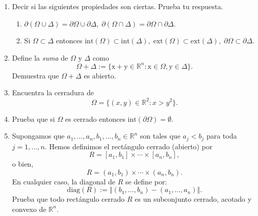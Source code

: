 \documentclass[12pt]{article}
\newcommand{\norm}[1]{\left\Vert#1\right\Vert}
\newcommand{\diag}{\mathrm{diag}}
\newcommand{\Ext}{\mathrm{ext}}
\newcommand{\Int}{\mathrm{int}}
\newcommand{\R}{\mathbb R}
\newcommand{\x}{\mathrm x}
\newcommand{\y}{\mathrm y}
\begin{document}
\begin{enumerate}
Para encontrar la cerradura, observamos que si tomamos puntos $(x,y)$ que cumplen $x^2 - y^2 > 1$ y los acercamos a la curva $x^2 - y^2 = 1$, podemos aproximarnos tanto como queramos. Por lo tanto, la cerradura de $\Omega$ es el conjunto donde $x^2 - y^2 \geq 1$. Es decir,
\[
\overline{\Omega} = \{ (x,y)\in \R^2 : x^2 - y^2 \geq 1 \}.
\]
Esto se debe a que la adherencia de un conjunto abierto definido por una desigualdad estricta con una función continua es el conjunto definido por la desigualdad no estricta correspondiente.

Ahora, determinamos la frontera. Usando la definición de frontera como $\partial \Omega = \overline{\Omega} \setminus \Int(\Omega)$, tenemos:
\[
\partial \Omega = \{ (x,y)\in \R^2 : x^2 - y^2 \geq 1 \} \setminus \{ (x,y)\in \R^2 : x^2 - y^2 > 1 \}.
\]
La diferencia entre estos dos conjuntos es precisamente el conjunto de puntos donde se cumple la igualdad. Por lo tanto,
\[
\partial \Omega = \{ (x,y)\in \R^2 : x^2 - y^2 = 1 \}.
\]

\item Decir si las siguientes propiedades son ciertas. Prueba tu respuesta.
\begin{enumerate}[(1)]
\item $\partial(\Omega\cup \Delta) = \partial \Omega\cup \partial \Delta,\; 
\partial(\Omega\cap \Delta) = \partial \Omega\cap \partial \Delta$.
\item Si $\Omega\subset \Delta$ entonces $\Int(\Omega)\subset \Int(\Delta),\; \Ext(\Omega)\subset \Ext(\Delta),\; \partial \Omega\subset \partial \Delta$.
\end{enumerate}

\item Define la \emph{suma} de $\Omega$ y $\Delta$ como
\[ \Omega + \Delta := \{ \x+\y\in \R^n : \x\in \Omega, \y\in \Delta \}. \]
Demuestra que $\Omega + \Delta$ es abierto.

\item Encuentra la cerradura de 
\[ \Omega = \{ (x,y)\in \R^2 : x > y^2 \}. \]

\item Prueba que si $\Omega$ es cerrado entonces 
$\Int(\partial \Omega)=\emptyset$.

\item Supongamos que $a_1,\ldots,a_n,b_1,\ldots,b_n\in \R^n$ son tales que $a_j<b_j$ para toda $j=1,\ldots,n$. Hemos definimos el rectángulo cerrado (abierto) por
\[ R = [a_1,b_1]\times \cdots\times [a_n,b_n], \]
o bien,
\[ R = (a_1,b_1)\times \cdots\times (a_n,b_n). \]
En cualquier caso, la \textsf{diagonal} de $R$ se define por:
\[ \diag(R) := \norm{(b_1,\ldots,b_n) - (a_1,\ldots,a_n)}. \]
Prueba que todo rectángulo cerrado $R$ es un subconjunto cerrado, acotado y convexo de $\R^n$. 

\end{enumerate}
\end{document}
